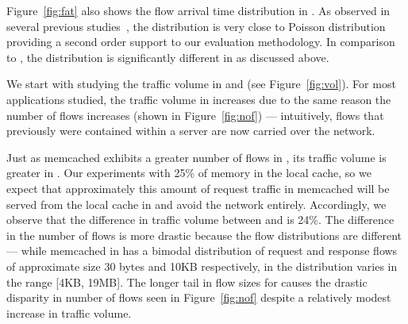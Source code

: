 Figure~\ref{fig:fat} also shows the flow arrival time distribution in \pdis. As observed in several previous studies~\cite{srikanth, theo}, the distribution is very close to Poisson distribution providing a second order support to our evaluation methodology. In comparison to \pdis, the distribution is significantly different in \dis as discussed above.

We start with studying the traffic volume in \dis and \pdis (see Figure~\ref{fig:vol}). For most applications studied, the traffic volume in \dis increases due to the same reason the number of flows increases (shown in Figure~\ref{fig:nof}) --- intuitively, flows that previously were contained within a server are now carried over the network.

Just as memcached exhibits a greater number of flows in \pdis, its traffic volume is greater in \dis. Our experiments with 25\% of memory in the local cache, so we expect that approximately this amount of request traffic in memcached will be served from the local cache in \dis and avoid the network entirely. Accordingly, we observe that the difference in traffic volume between \dis and \pdis is 24\%. The difference in the number of flows is more drastic because the flow distributions are different --- while memcached in \pdis has a bimodal distribution of request and response flows of approximate size 30 bytes and 10KB respectively, in \dis the distribution varies in the range [4KB, 19MB]. The longer tail in flow sizes for \dis causes the drastic disparity in number of flows seen in Figure~\ref{fig:nof} despite a relatively modest increase in traffic volume.


